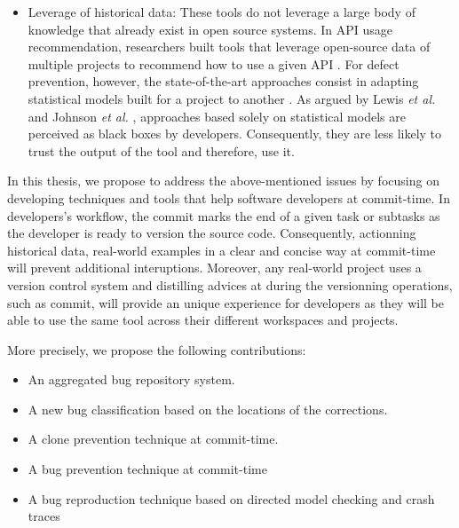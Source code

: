 \begin{itemize}
	\item Leverage of historical data: These tools do not leverage a large body of knowledge that already exist in open source systems.
	In API usage recommendation, researchers built tools that leverage open-source data of multiple projects to recommend how to use a given API \cite{Rahman2013,Kim2013d,Montandon2013}.
	For defect prevention, however, the state-of-the-art approaches consist in adapting statistical models built for a project to another \cite{Lo2013,Nam2013}.
	As argued by Lewis {\it et al.} \cite{Lewis2013} and Johnson {\it et al.} \cite{Johnson2013}, approaches based solely on statistical models are perceived as black boxes by developers.
	Consequently, they are less likely to trust the output of the tool and therefore, use it.
\end{itemize}

In this thesis, we propose to address the above-mentioned issues by focusing on developing techniques and tools that help software developers at commit-time.
In developers's workflow, the commit marks the end of a given task or subtasks as the developer is ready to version the source code.
Consequently, actionning historical data, real-world examples in a clear and concise way at commit-time will prevent additional interuptions.
Moreover, any real-world project uses a version control system and distilling advices at during the versionning operations, such as commit, will provide an unique experience for developers as they will be able to use the same tool across their different workspaces and projects.

More precisely, we propose the following contributions:
\begin{itemize}
	\item An aggregated bug repository system.
	\item A new bug classification based on the locations of the corrections.
	\item A clone prevention technique at commit-time.
	\item A bug prevention technique at commit-time
	\item A bug reproduction technique based on directed model checking and crash traces
\end{itemize}

